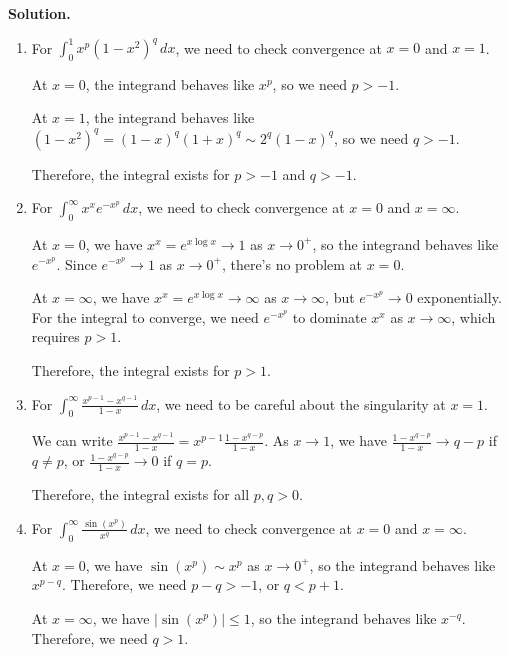 \noindent\textbf{Solution.}
\begin{enumerate}[label=(\alph*)]
    \item For $\int_{0}^{1} x^p (1 - x^2)^q \, dx$, we need to check convergence at $x = 0$ and $x = 1$.
    
    At $x = 0$, the integrand behaves like $x^p$, so we need $p > -1$.
    
    At $x = 1$, the integrand behaves like $(1 - x^2)^q = (1 - x)^q (1 + x)^q \sim 2^q (1 - x)^q$, so we need $q > -1$.
    
    Therefore, the integral exists for $p > -1$ and $q > -1$.
    
    \item For $\int_{0}^{\infty} x^x e^{-x^p} \, dx$, we need to check convergence at $x = 0$ and $x = \infty$.
    
    At $x = 0$, we have $x^x = e^{x \log x} \to 1$ as $x \to 0^+$, so the integrand behaves like $e^{-x^p}$. Since $e^{-x^p} \to 1$ as $x \to 0^+$, there's no problem at $x = 0$.
    
    At $x = \infty$, we have $x^x = e^{x \log x} \to \infty$ as $x \to \infty$, but $e^{-x^p} \to 0$ exponentially. For the integral to converge, we need $e^{-x^p}$ to dominate $x^x$ as $x \to \infty$, which requires $p > 1$.
    
    Therefore, the integral exists for $p > 1$.
    
    \item For $\int_{0}^{\infty} \frac{x^{p-1} - x^{q-1}}{1 - x} \, dx$, we need to be careful about the singularity at $x = 1$.
    
    We can write $\frac{x^{p-1} - x^{q-1}}{1 - x} = x^{p-1} \frac{1 - x^{q-p}}{1 - x}$. As $x \to 1$, we have $\frac{1 - x^{q-p}}{1 - x} \to q - p$ if $q \neq p$, or $\frac{1 - x^{q-p}}{1 - x} \to 0$ if $q = p$.
    
    Therefore, the integral exists for all $p, q > 0$.
    
    \item For $\int_{0}^{\infty} \frac{\sin(x^p)}{x^q} \, dx$, we need to check convergence at $x = 0$ and $x = \infty$.
    
    At $x = 0$, we have $\sin(x^p) \sim x^p$ as $x \to 0^+$, so the integrand behaves like $x^{p-q}$. Therefore, we need $p - q > -1$, or $q < p + 1$.
    
    At $x = \infty$, we have $|\sin(x^p)| \leq 1$, so the integrand behaves like $x^{-q}$. Therefore, we need $q > 1$.
    

\end{enumerate}
